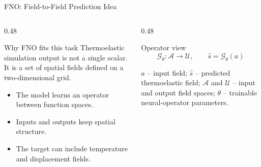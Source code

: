 
\begin{frame}{FNO: Field-to-Field Prediction Idea}
  \begin{columns}[T]
    \begin{column}{0.48\textwidth}
      \begin{block}{Why FNO fits this task}
        \footnotesize
        Thermoelastic simulation output is not a single scalar. It is a set
        of spatial fields defined on a two-dimensional grid.
      \end{block}
      \begin{itemize}
        \footnotesize
        \item The model learns an operator between function spaces.
        \item Inputs and outputs keep spatial structure.
        \item The target can include temperature and displacement fields.
      \end{itemize}
    \end{column}
    \begin{column}{0.48\textwidth}
      \begin{block}{Operator view}
        \[
          \mathcal{G}_{\theta}:\mathcal{A}\rightarrow\mathcal{U},
          \qquad
          \hat{s}=\mathcal{G}_{\theta}(a)
        \]
      \end{block}
      \scriptsize
      $a$ -- input field; $\hat{s}$ -- predicted thermoelastic field;
      $\mathcal{A}$ and $\mathcal{U}$ -- input and output field spaces;
      $\theta$ -- trainable neural-operator parameters.
    \end{column}
  \end{columns}
\end{frame}

